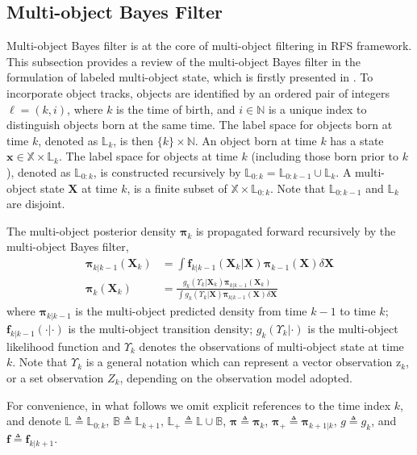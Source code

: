 \documentclass[journal]{IEEEtran}
\newcommand{\bff}{{\mathbf{f}}}
\newcommand{\bX}{{\mathbf X}}
\newcommand{\bx}{{\mathbf x}}
\newcommand{\bpi}{{\boldsymbol\pi}}
\begin{document}
\subsection{Multi-object Bayes Filter}
Multi-object Bayes filter is at the core of multi-object filtering in RFS framework. This subsection provides  a   review of  the multi-object Bayes filter in the formulation of labeled multi-object state, which is firstly presented in \cite{refr:label_1}.  To incorporate object tracks, objects are identified by an ordered pair of integers $\ell=(k,i)$, where $k$ is the time of birth, and $i\in\mathbb{N}$ is
a unique index to distinguish objects born at the same time.
The label space for objects born at time $k$, denoted as $\mathbb{L}_k$, is
then $\{k\}\times\mathbb{N}$. An object born at time $k$ has  a state $\bx\in\mathbb{X}\times\mathbb{L}_k$.
The label space for objects at time $k$ (including those born
prior to $k$), denoted as $\mathbb{L}_{0:k}$, is constructed recursively by
$\mathbb{L}_{0:k} =\mathbb{L}_{0:k-1}\cup\mathbb{L}_{k}$. A multi-object state $\bX$ at time $k$, is a
finite subset of $\mathbb{X}\times\mathbb{L}_{0:k}$. Note that $\mathbb{L}_{0:k-1}$ and $\mathbb{L}_k$ are disjoint.

The multi-object posterior density $\bpi_k$ is propagated forward recursively by the multi-object Bayes filter,
\begin{align}
\label{predict} \bpi_{k|k-1}(\bX_{k})&=\int \bff_{k|k-1}(\bX_{k}|\bX)\bpi_{k-1}(\bX)\delta\bX\\
\label{update}\bpi_k(\bX_k)&=\frac{g_k(\Upsilon_k|\bX_k)\bpi_{k|k-1}(\bX_k)}{\int g_k(\Upsilon_k|\bX)\bpi_{k|k-1}(\bX)\delta\bX}
\end{align}
where $\bpi_{k|k-1}$ is the  multi-object predicted density from time $k-1$ to time $k$; $\bff_{k|k-1}(\cdot|\cdot)$ is the multi-object transition density; $g_k(\Upsilon_k|\cdot)$ is the multi-object likelihood function and $\Upsilon_k$ denotes the observations of multi-object state  at time $k$. Note that $\Upsilon_k$ is a general notation which can represent a vector observation $\mathrm{z}_k$, or  a set  observation $Z_k$, depending on the observation model  adopted.

For convenience, in what follows we omit explicit references
to the time index $k$, and denote $\mathbb{L}\triangleq\mathbb{L}_{0:k}$,   $\mathbb{B}\triangleq\mathbb{L}_{k+1}$, $\mathbb{L}_+\triangleq\mathbb{L}\cup\mathbb{B}$, $\bpi\triangleq\bpi_k$, $\bpi_+\triangleq\bpi_{k+1|k}$, $g\triangleq g_k$, and $\bff\triangleq\bff_{k|k+1}$.
\end{document}
